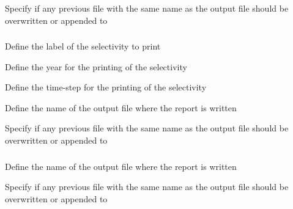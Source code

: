  {Specify if any previous file with the same name as the output file should be overwritten or appended to}

\subsubsection[Print a selectivity]{}

 {Define the label of the selectivity to print}

 {Define the year for the printing of the selectivity}

 {Define the time-step for the printing of the selectivity}

 {Define the name of the output file where the report is written}

 {Specify if any previous file with the same name as the output file should be overwritten or appended to}

\subsubsection[Print the random number seed used]{}

 {Define the name of the output file where the report is written}

 {Specify if any previous file with the same name as the output file should be overwritten or appended to}

\subsubsection[Print the weight-at-size]{}

